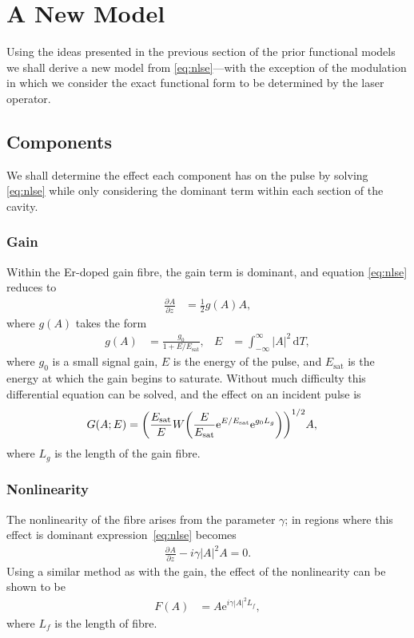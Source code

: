 \documentclass[10pt,twocolumn,a4paper]{article}
\let\originalleft\left
\let\originalright\right
\renewcommand{\left}{\mathopen{}\mathclose\bgroup\originalleft}
\renewcommand{\right}{\aftergroup\egroup\originalright}
\providecommand{\df}{\textrm{d}}
\newcommand{\pdiff}[3][]{\frac{\partial^{#1}#2}{\partial{#3}^{#1}}}
\newcommand{\Es}{E_{\textrm{sat}}}
\begin{document}
\section{A New Model}
\label{sec:newmodel}
Using the ideas presented in the previous section of the prior functional models \cite{burgoyne2014, cutler, kuizenga1970a, kuizenga1970b, kuizenga1970, martinez1984, martinez1985, siegman} we shall derive a new model from \eqref{eq:nlse}---with the exception of the modulation in which we consider the exact functional form to be determined by the laser operator.

\subsection{Components}
We shall determine the effect each component has on the pulse by solving \eqref{eq:nlse} while only considering the dominant term within each section of the cavity.

\subsubsection{Gain}
Within the Er-doped gain fibre, the gain term is dominant, and equation \eqref{eq:nlse} reduces to
\begin{align}
\label{eq:gainde}
\pdiff{A}{z} &= \frac{1}{2} g(A) A,
\end{align}
where $g(A)$ takes the form \cite{bohun, burgoyne2014, haus1975, hausbook, haus1992, haus2000, haus1991, kartner, peng, shtyrina, silfvast, usechak, yarutkina}
\begin{align}
\label{eq:energy}
	g(A) &= \frac{g_0}{1 + E / \Es},& E &= \int_{-\infty}^\infty |A|^2 \, \df T,
\end{align}
where $g_0$ is a small signal gain, $E$ is the energy of the pulse, and $\Es$ is the energy at which the gain begins to saturate. Without much difficulty this differential equation can be solved, and the effect on an incident pulse is
\begin{align}
G(A;E) &= \left( \frac{\Es}{E} W \left( \frac{E}{\Es} \textrm{e}^{E/\Es} \textrm{e}^{g_0 L_g} \right) \right)^{1/2} A,
\end{align}
where $L_g$ is the length of the gain fibre.

\subsubsection{Nonlinearity}
The nonlinearity of the fibre arises from the parameter $\gamma$; in regions where this effect is dominant expression~\eqref{eq:nlse} becomes
\begin{align}
\label{eq:fibrediff}
	\pdiff{A}{z} - i \gamma |A|^2 A = 0.
\end{align}
Using a similar method as with the gain, the effect of the nonlinearity can be shown to be
\begin{align}
F(A) &= A \textrm{e}^{i \gamma |A|^2 L_f},
\end{align}
where $L_f$ is the length of fibre.
\end{document}
